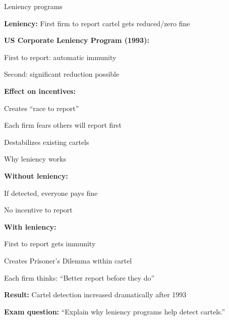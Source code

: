 \documentclass[notes,11pt, aspectratio=169]{beamer}
\newenvironment{wideitemize}{\itemize\addtolength{\itemsep}{10pt}}{\enditemize}
\begin{document}
\begin{frame}{Leniency programs}
	\begin{wideitemize}
		\item \textbf{Leniency:} First firm to report cartel gets reduced/zero fine
		\item \textbf{US Corporate Leniency Program (1993):}
		\begin{wideitemize}
			\vspace{5pt}
			\item First to report: automatic immunity
			\item Second: significant reduction possible
		\end{wideitemize}
		\item \textbf{Effect on incentives:}
		\begin{wideitemize}
			\vspace{5pt}
			\item Creates ``race to report''
			\item Each firm fears others will report first
			\item Destabilizes existing cartels
		\end{wideitemize}
	\end{wideitemize}
\end{frame}

\begin{frame}{Why leniency works}
	\begin{wideitemize}
		\item \textbf{Without leniency:}
		\begin{wideitemize}
			\vspace{5pt}
			\item If detected, everyone pays fine
			\item No incentive to report
		\end{wideitemize}
		\item \textbf{With leniency:}
		\begin{wideitemize}
			\vspace{5pt}
			\item First to report gets immunity
			\item Creates Prisoner's Dilemma within cartel
			\item Each firm thinks: ``Better report before they do''
		\end{wideitemize}
		\item \textbf{Result:} Cartel detection increased dramatically after 1993
		\item \textbf{Exam question:} ``Explain why leniency programs help detect cartels.''
	\end{wideitemize}
\end{frame}
\end{document}
